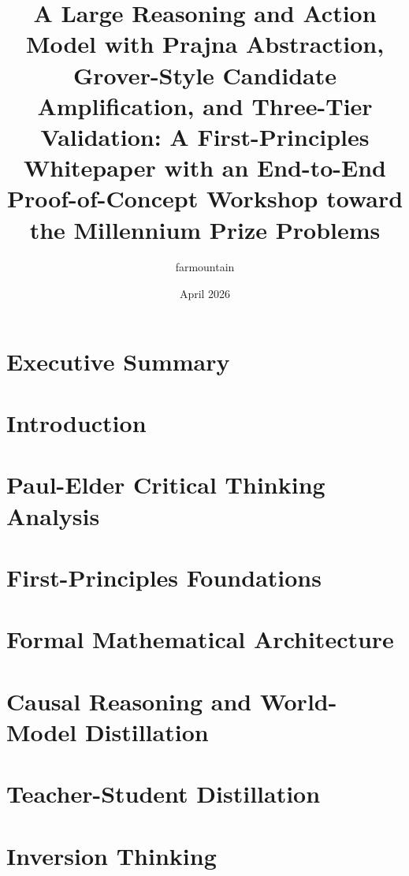 \documentclass[11pt,a4paper]{article}
\title{A Large Reasoning and Action Model with Prajna Abstraction, Grover-Style Candidate Amplification, and Three-Tier Validation: A First-Principles Whitepaper with an End-to-End Proof-of-Concept Workshop toward the Millennium Prize Problems}
\author{farmountain}
\date{April 2026}
\begin{document}
\maketitle

\begin{abstract}

\end{abstract}

\tableofcontents

\newpage

\section{Executive Summary}


\section{Introduction}


\section{Paul-Elder Critical Thinking Analysis}


\section{First-Principles Foundations}


\section{Formal Mathematical Architecture}


\section{Causal Reasoning and World-Model Distillation}


\section{Teacher-Student Distillation}


\section{Inversion Thinking}

\end{document}
